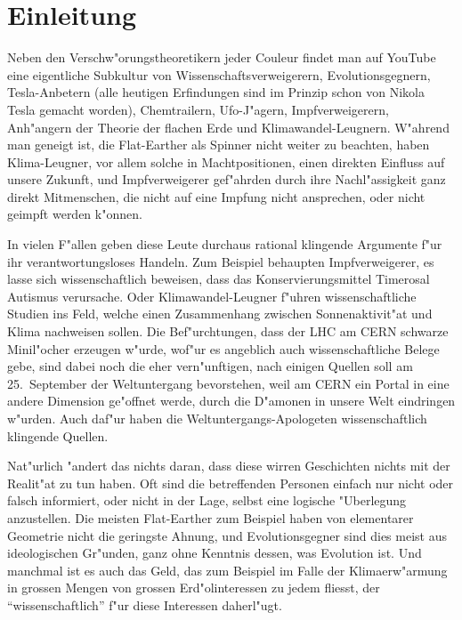 %
%
%
\chapter*{Einleitung}
Neben den Verschw"orungstheoretikern jeder Couleur findet man
auf YouTube eine eigentliche Subkultur von Wissenschaftsverweigerern,
Evolutionsgegnern, Tesla-Anbetern (alle heutigen Erfindungen sind im
Prinzip schon von Nikola Tesla gemacht worden), Chemtrailern, 
Ufo-J"agern,
Impfverweigerern, Anh"angern der Theorie der flachen Erde
und Klimawandel-Leugnern.
W"ahrend man geneigt ist, die Flat-Earther als Spinner nicht weiter
zu beachten, haben Klima-Leugner, vor allem solche in Machtpositionen,
einen direkten Einfluss auf unsere Zukunft, und Impfverweigerer
gef"ahrden durch ihre Nachl"assigkeit ganz direkt Mitmenschen, die
nicht auf eine Impfung nicht ansprechen, oder nicht geimpft werden
k"onnen.

In vielen F"allen geben diese Leute durchaus rational klingende
Argumente f"ur ihr verantwortungsloses Handeln.
Zum Beispiel behaupten Impfverweigerer, es lasse sich wissenschaftlich
beweisen, dass das Konservierungsmittel Timerosal Autismus verursache.
Oder Klimawandel-Leugner f"uhren wissenschaftliche Studien ins Feld,
welche einen Zusammenhang zwischen Sonnenaktivit"at und Klima 
nachweisen sollen.
Die Bef"urchtungen, dass der LHC am CERN schwarze Minil"ocher erzeugen
w"urde, wof"ur es angeblich auch wissenschaftliche Belege gebe,
sind dabei noch die eher vern"unftigen, nach einigen Quellen soll
am 25.~September der Weltuntergang bevorstehen, weil am CERN ein
Portal in eine andere Dimension ge"offnet werde, durch die D"amonen
in unsere Welt eindringen w"urden.
Auch daf"ur haben die Weltuntergangs-Apologeten wissenschaftlich
klingende Quellen.

Nat"urlich "andert das nichts daran, dass diese wirren Geschichten
nichts mit der Realit"at zu tun haben.
Oft sind die betreffenden Personen einfach nur nicht oder falsch
informiert, oder nicht in der Lage, selbst eine logische "Uberlegung
anzustellen.
Die meisten Flat-Earther zum Beispiel haben von elementarer Geometrie
nicht die geringste Ahnung, und Evolutionsgegner sind dies meist aus
ideologischen Gr"unden, ganz ohne Kenntnis dessen, was Evolution ist.
Und manchmal ist es auch das Geld, das zum Beispiel im Falle der 
Klimaerw"armung in grossen Mengen von grossen Erd"olinteressen zu
jedem fliesst, der ``wissenschaftlich'' f"ur diese Interessen
daherl"ugt.


